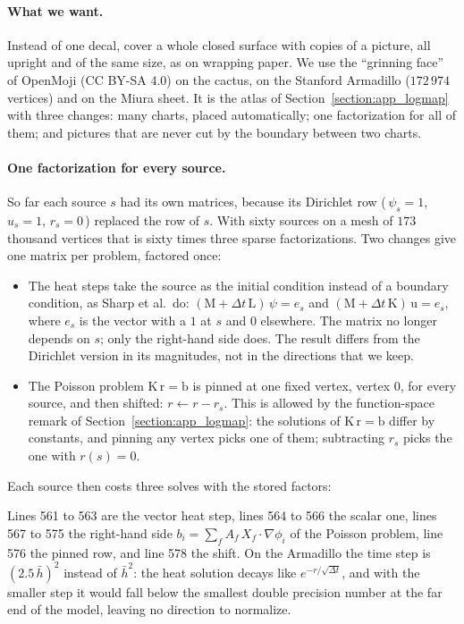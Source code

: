 \paragraph{What we want.} Instead of one decal, cover a whole closed surface with copies of a picture, all upright and of the same size, as on wrapping paper. We use the ``grinning face'' of OpenMoji (CC BY-SA 4.0) on the cactus, on the Stanford Armadillo ($172\,974$ vertices) and on the Miura sheet. It is the atlas of Section~\ref{section:app_logmap} with three changes: many charts, placed automatically; one factorization for all of them; and pictures that are never cut by the boundary between two charts.

\paragraph{One factorization for every source.} So far each source $s$ had its own matrices, because its Dirichlet row (\,$\psi_s = 1$, $u_s = 1$, $r_s = 0$\,) replaced the row of $s$. With sixty sources on a mesh of $173$ thousand vertices that is sixty times three sparse factorizations. Two changes give one matrix per problem, factored once:
\begin{itemize}
\item The heat steps take the source as the initial condition instead of a boundary condition, as Sharp et al.\ do: $(\mathrm M + \Delta t\,\mathrm L)\,\psi = e_s$ and $(\mathrm M + \Delta t\,\mathrm K)\,\mathrm u = e_s$, where $e_s$ is the vector with a $1$ at $s$ and $0$ elsewhere. The matrix no longer depends on $s$; only the right-hand side does. The result differs from the Dirichlet version in its magnitudes, not in the directions that we keep.
\item The Poisson problem $\mathrm K\,\mathrm r = \mathrm b$ is pinned at one fixed vertex, vertex $0$, for every source, and then shifted: $r \leftarrow r - r_s$. This is allowed by the function-space remark of Section~\ref{section:app_logmap}: the solutions of $\mathrm K\,\mathrm r = \mathrm b$ differ by constants, and pinning any vertex picks one of them; subtracting $r_s$ picks the one with $r(s) = 0$.
\end{itemize}
Each source then costs three solves with the stored factors:

Lines 561 to 563 are the vector heat step, lines 564 to 566 the scalar one, lines 567 to 575 the right-hand side $b_i = \sum_f A_f\,X_f\cdot\nabla\phi_i$ of the Poisson problem, line 576 the pinned row, and line 578 the shift. On the Armadillo the time step is $(2.5\,\bar h)^2$ instead of $\bar h^2$: the heat solution decays like $e^{-r/\sqrt{\Delta t}}$, and with the smaller step it would fall below the smallest double precision number at the far end of the model, leaving no direction to normalize.

